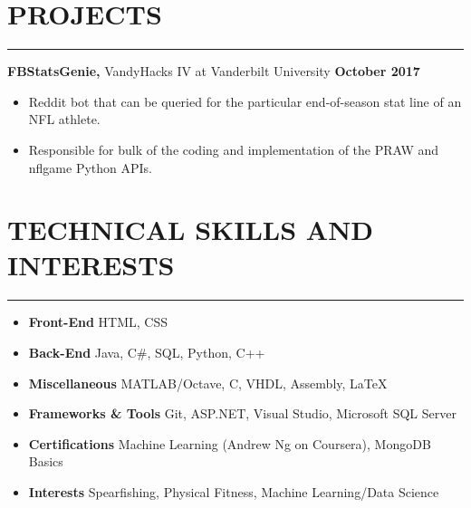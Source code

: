 \documentclass[11pt]{article} %
\begin{document}
	\section*{PROJECTS}
		\hrule \relax
		\vspace{.4cm}
		
		\noindent \textbf{FBStatsGenie,} VandyHacks IV at Vanderbilt University \hfill\textbf{October 2017}
		\begin{itemize}[noitemsep,nolistsep, label={-}]
			\item Reddit bot that can be queried for the particular end-of-season stat line of an NFL athlete.
			\item Responsible for bulk of the coding and implementation of the PRAW and nflgame Python APIs.
		\end{itemize}
		
		\vspace{.1cm}
	
	\section*{TECHNICAL SKILLS AND INTERESTS}
		\hrule \relax
		\vspace{.4cm}
		
		\begin{itemize}[noitemsep,nolistsep, label={}]
			\item \textbf{Front-End}                   \tabto*{5cm} HTML, CSS
			\item \textbf{Back-End}                    \tabto*{5cm} Java, C\#,  SQL, Python, C++
			\item \textbf{Miscellaneous}             \tabto*{5cm} MATLAB/Octave, C, VHDL, Assembly, \LaTeX
			\item \textbf{Frameworks \& Tools}  \tabto*{5cm} Git, ASP.NET, Visual Studio, Microsoft SQL Server
			\item \textbf{Certifications}			   \tabto*{5cm} Machine Learning (Andrew Ng on Coursera), MongoDB Basics
			\item \textbf{Interests}                     \tabto*{5cm} Spearfishing, Physical Fitness, Machine Learning/Data Science
		\end{itemize}
		
		\vspace{.1cm}
	
\end{document}
